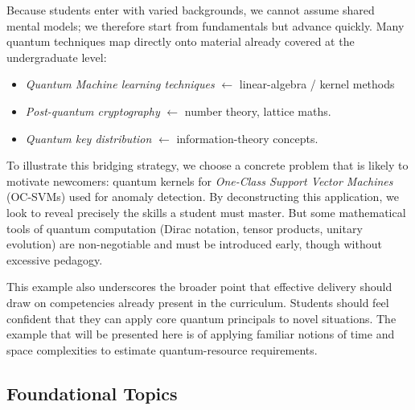 

Because students enter with varied backgrounds, we cannot assume shared mental models; 
we therefore start from fundamentals but advance quickly.
Many quantum techniques map directly onto material already covered at the undergraduate level:

\begin{itemize}
	\item \emph{Quantum Machine learning techniques} \cite{Schuld:2014} $\leftarrow$ linear-algebra / kernel methods
	\item \emph{Post-quantum cryptography} \cite{Bernstein:2008} $\leftarrow$ number theory, lattice maths.
	\item \emph{Quantum key distribution} \cite{MummadiFathima:2024} $\leftarrow$ information-theory concepts.
\end{itemize}

To illustrate this bridging strategy, we choose a concrete problem that is likely to motivate newcomers:
quantum kernels for \emph{One-Class Support Vector Machines} (OC-SVMs) used for anomaly detection.
By deconstructing this application, we look to reveal precisely the skills a student must master.
But some mathematical tools of quantum computation (Dirac notation, tensor products, unitary evolution)
are non-negotiable and must be introduced early, though without excessive pedagogy.

This example also underscores the broader point that
effective delivery should draw on competencies already present in the curriculum.
Students should feel confident that they can apply core quantum principals to novel situations.  
The example that will be presented here is of applying familiar notions of time and space complexities 
to estimate quantum-resource requirements.

\subsection{Foundational Topics}

